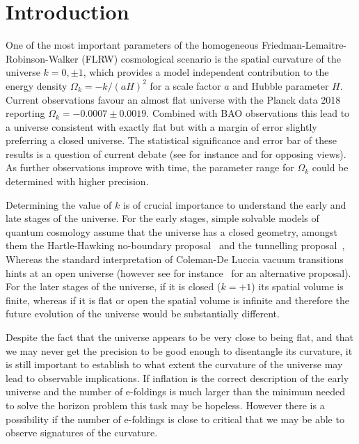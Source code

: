 \documentclass[a4paper,11pt]{article}
\numberwithin{equation}{section}
\numberwithin{equation}{section}
\begin{document}
\newpage

\tableofcontents


\renewcommand*{\thefootnote}{\arabic{footnote}}
\setcounter{footnote}{0}

\newpage




\section{Introduction}
One of the most important parameters of the homogeneous Friedman-Lemaitre-Robinson-Walker (FLRW) cosmological scenario is the spatial curvature of the universe $k=0,\pm 1$, which provides a model independent contribution to the energy density $\Omega_k=-k/(aH)^2$ for  a scale factor $a$ and Hubble parameter $H$. Current observations favour an almost flat universe with the Planck data 2018~\cite{Planck:2018jri} reporting $\Omega_k=-0.0007\pm 0.0019$. Combined with BAO observations this lead to a universe consistent with exactly flat but with a margin of error slightly preferring a closed universe. The statistical significance and error bar of these results is a question of current debate
 (see for instance \cite{Handley:2019tkm,DiValentino:2020hov} and  \cite{Efstathiou:2020wem} for  opposing views). As further observations improve with time, the parameter range for $\Omega_k$ could be determined with higher precision. 

Determining the value of $k$ is of crucial importance to understand the early and late stages of the universe. For the early stages, simple solvable models of quantum cosmology assume that the universe has a  closed geometry, amongst them the Hartle-Hawking no-boundary proposal~\cite{Hartle:1983ai} and the tunnelling proposal~\cite{Vilenkin:1982de,Vilenkin:1984wp}, Whereas the standard interpretation of Coleman-De Luccia vacuum transitions hints at an open universe (however see for instance~\cite{Cespedes:2020xpn} 
for an alternative proposal). For the later stages of the universe, if it is closed ($k=+1$) its spatial volume is finite, whereas if it is flat or open the spatial volume is infinite and therefore the future evolution of the universe would be substantially different.

Despite the fact that the universe appears to be very close to being flat, and that we may never get the precision to be good enough to disentangle its curvature, it is still important to establish to what extent the curvature of the universe may lead to observable implications. If inflation is the correct description of the early universe and the number of e-foldings is much larger than the minimum needed to solve the horizon problem this task may be hopeless. However there is a possibility if the number of e-foldings is close to critical that we may be able to observe signatures of the curvature.
\end{document}
